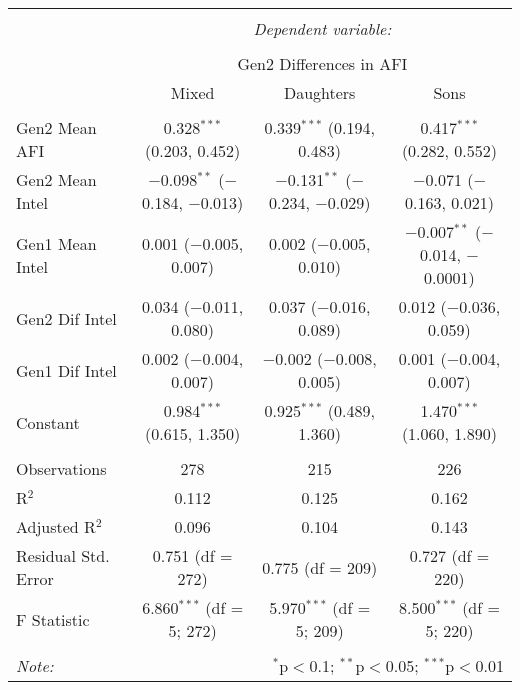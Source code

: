 
\begingroup 
\small 
\begin{tabular}{@{\extracolsep{1pt}}lccc} 
\\[-1.8ex]\hline 
\hline \\[-1.8ex] 
 & \multicolumn{3}{c}{\textit{Dependent variable:}} \\ 
\cline{2-4} 
\\[-1.8ex] & \multicolumn{3}{c}{Gen2 Differences in AFI} \\ 
 & Mixed & Daughters & Sons \\ 
\hline \\[-1.8ex] 
 Gen2 Mean AFI & 0.328$^{***}$ (0.203, 0.452) & 0.339$^{***}$ (0.194, 0.483) & 0.417$^{***}$ (0.282, 0.552) \\ 
  Gen2 Mean Intel & $-$0.098$^{**}$ ($-$0.184, $-$0.013) & $-$0.131$^{**}$ ($-$0.234, $-$0.029) & $-$0.071 ($-$0.163, 0.021) \\ 
  Gen1 Mean Intel & 0.001 ($-$0.005, 0.007) & 0.002 ($-$0.005, 0.010) & $-$0.007$^{**}$ ($-$0.014, $-$0.0001) \\ 
  Gen2 Dif Intel & 0.034 ($-$0.011, 0.080) & 0.037 ($-$0.016, 0.089) & 0.012 ($-$0.036, 0.059) \\ 
  Gen1 Dif Intel & 0.002 ($-$0.004, 0.007) & $-$0.002 ($-$0.008, 0.005) & 0.001 ($-$0.004, 0.007) \\ 
  Constant & 0.984$^{***}$ (0.615, 1.350) & 0.925$^{***}$ (0.489, 1.360) & 1.470$^{***}$ (1.060, 1.890) \\ 
 \hline \\[-1.8ex] 
Observations & 278 & 215 & 226 \\ 
R$^{2}$ & 0.112 & 0.125 & 0.162 \\ 
Adjusted R$^{2}$ & 0.096 & 0.104 & 0.143 \\ 
Residual Std. Error & 0.751 (df = 272) & 0.775 (df = 209) & 0.727 (df = 220) \\ 
F Statistic & 6.860$^{***}$ (df = 5; 272) & 5.970$^{***}$ (df = 5; 209) & 8.500$^{***}$ (df = 5; 220) \\ 
\hline 
\hline \\[-1.8ex] 
\textit{Note:}  & \multicolumn{3}{r}{$^{*}$p$<$0.1; $^{**}$p$<$0.05; $^{***}$p$<$0.01} \\ 
\end{tabular} 
\endgroup 
